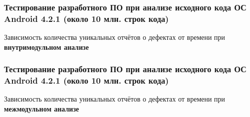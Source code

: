 \documentclass[hyperref={pdfpagelabels=false}]{beamer}
\begin{document}
\begin{frame}
\frametitle{Тестирование разработного ПО при анализе исходного кода ОС Android 4.2.1 (около 10 млн. строк кода)}
Зависимость количества уникальных отчётов о дефектах от времени  при \textbf{внутримодульном анализе}
\begin{figure}[h]
\end{figure}
\end{frame}

\begin{frame}
\frametitle{Тестирование разработного ПО при анализе исходного кода ОС Android 4.2.1 (около 10 млн. строк кода)}
Зависимость количества уникальных отчётов о дефектах от времени  при \textbf{межмодульном анализе}

\begin{figure}[h]
\end{figure}
\end{frame}
\end{document}
